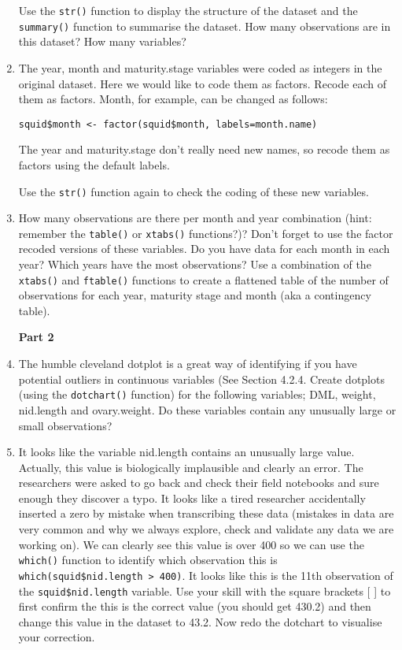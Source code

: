 \documentclass[12pt]{article}
\newcommand{\lst}[1]{\lstinline{#1}}
\begin{document}
\begin{enumerate}
  Use the \lst{str()} function to display the structure of the dataset and the \lst{summary()} function to summarise the dataset. How many observations are in this dataset? How many variables? 
  
\item
The  year, month and maturity.stage variables were coded as integers in the original dataset. Here we would like to code them as factors. Recode each of them as factors.  Month, for example, can be changed as follows:
\begin{lstlisting}
squid$month <- factor(squid$month, labels=month.name)
\end{lstlisting}

The year and maturity.stage don't really need new names, so recode them as factors
using the default labels.

Use the \lst{str()} function again to check the coding of these new variables.

 
\item How many observations are there per month and year combination (hint: remember the
{\tt table()} or {\tt xtabs()} functions?)? Don’t forget to use the factor recoded versions of these variables. Do you have data for each month in each year? Which years have the most observations?  Use a combination of the {\tt xtabs()} and {\tt ftable()} functions to create a flattened table of the number of observations for each year, maturity stage and month (aka a contingency table).

\centerline{\bf Part 2}

 
\item The humble cleveland dotplot is a great way of identifying if you have potential outliers in continuous variables (See Section 4.2.4. Create dotplots (using the \lst{dotchart()} function) for the following variables; DML, weight, nid.length and ovary.weight. Do these variables contain any unusually large or small observations?

 
\item It looks like the variable nid.length contains an unusually large value. Actually, this value is biologically implausible and clearly an error. The researchers were asked to go back and check their field notebooks and sure enough they discover a typo. It looks like a tired researcher accidentally inserted a zero by mistake when transcribing these data (mistakes in data are very common and why we always explore, check and validate any data we are working on). We can clearly see this value is over 400 so we can use the \lst{which()} function to identify which observation this is \lst{which(squid$nid.length > 400)}.
 It looks like this is the 11th observation of the \lst{squid$nid.length} variable. Use your skill with the square brackets [ ] to first confirm the this is the correct value (you should get 430.2) and then change this value in the dataset to 43.2. Now redo the dotchart to visualise your correction.
 

\end{enumerate}
\end{document}
